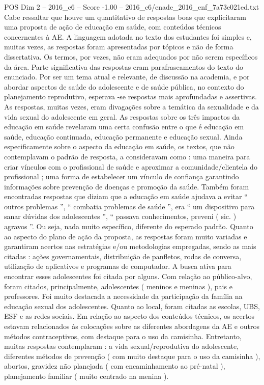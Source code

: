 \begin{textsample}{POS Dim 2 – 2016\_c6 – Score -1.00 – 2016\_c6/enade\_2016\_enf\_7a73e021ed.txt}
Cabe ressaltar que houve um quantitativo de respostas boas que explicitaram uma proposta de ação de educação em saúde, com conteúdos técnicos concernentes à AE.
A linguagem adotada no texto dos estudantes foi simples e, muitas vezes, as respostas foram apresentadas por tópicos e não de forma dissertativa.
Os termos, por vezes, não eram adequados por não serem específicos da área.
Parte significativa das respostas eram parafraseamentos do texto do enunciado.
Por ser um tema atual e relevante, de discussão na academia, e por abordar aspectos de saúde do adolescente e de saúde pública, no contexto do planejamento reprodutivo, esperava -se respostas mais aprofundadas e assertivas.
As respostas, muitas vezes, eram divagações sobre a temática da sexualidade e da vida sexual do adolescente em geral.
As respostas sobre os três impactos da educação em saúde revelaram uma certa confusão entre o que é educação em saúde, educação continuada, educação permanente e educação sexual.
Ainda especificamente sobre o aspecto da educação em saúde, os textos, que não contemplavam o padrão de resposta, a consideravam como : uma maneira para criar vínculos com o profissional de saúde e aproximar a comunidade/clientela do profissional ; uma forma de estabelecer um vínculo de confiança garantindo informações sobre prevenção de doenças e promoção da saúde.
Também foram encontradas respostas que diziam que a educação em saúde ajudava a evitar “ outros problemas ”, “ combatia problemas de saúde ”, era “ um dispositivo para sanar dúvidas dos adolescentes ”, “ passava conhecimentos, preveni ( sic. ) agravos ”.
Ou seja, nada muito específico, diferente do esperado padrão.
Quanto ao aspecto do plano de ação da proposta, as respostas foram muito variadas e garantiram acertos nas estratégias e/ou metodologias empregadas, sendo as mais citadas : ações governamentais, distribuição de panfletos, rodas de conversa, utilização de aplicativos e programas de computador.
A busca ativa para encontrar esses adolescentes foi citada por alguns.
Com relação ao público-alvo, foram citados, principalmente, adolescentes ( meninos e meninas ), pais e professores.
Foi muito destacada a necessidade da participação da família na educação sexual dos adolescentes.
Quanto ao local, foram citadas as escolas, UBS, ESF e as redes sociais.
Em relação ao aspecto dos conteúdos técnicos, os acertos estavam relacionados às colocações sobre as diferentes abordagens da AE e outros métodos contraceptivos, com destaque para o uso da camisinha.
Entretanto, muitas respostas contemplaram : a vida sexual/reprodutiva do adolescente, diferentes métodos de prevenção ( com muito destaque para o uso da camisinha ), abortos, gravidez não planejada ( com encaminhamento ao pré-natal ), planejamento familiar ( muito centrado na menina ).

\end{textsample}
